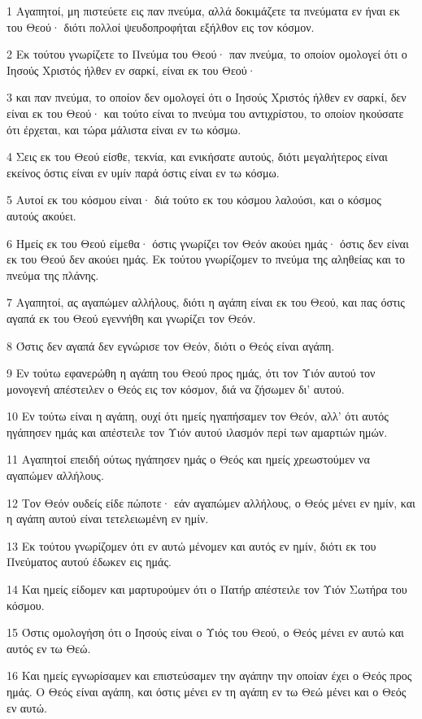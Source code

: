 \par 1 Αγαπητοί, μη πιστεύετε εις παν πνεύμα, αλλά δοκιμάζετε τα πνεύματα εν ήναι εκ του Θεού· διότι πολλοί ψευδοπροφήται εξήλθον εις τον κόσμον.
\par 2 Εκ τούτου γνωρίζετε το Πνεύμα του Θεού· παν πνεύμα, το οποίον ομολογεί ότι ο Ιησούς Χριστός ήλθεν εν σαρκί, είναι εκ του Θεού·
\par 3 και παν πνεύμα, το οποίον δεν ομολογεί ότι ο Ιησούς Χριστός ήλθεν εν σαρκί, δεν είναι εκ του Θεού· και τούτο είναι το πνεύμα του αντιχρίστου, το οποίον ηκούσατε ότι έρχεται, και τώρα μάλιστα είναι εν τω κόσμω.
\par 4 Σεις εκ του Θεού είσθε, τεκνία, και ενικήσατε αυτούς, διότι μεγαλήτερος είναι εκείνος όστις είναι εν υμίν παρά όστις είναι εν τω κόσμω.
\par 5 Αυτοί εκ του κόσμου είναι· διά τούτο εκ του κόσμου λαλούσι, και ο κόσμος αυτούς ακούει.
\par 6 Ημείς εκ του Θεού είμεθα· όστις γνωρίζει τον Θεόν ακούει ημάς· όστις δεν είναι εκ του Θεού δεν ακούει ημάς. Εκ τούτου γνωρίζομεν το πνεύμα της αληθείας και το πνεύμα της πλάνης.
\par 7 Αγαπητοί, ας αγαπώμεν αλλήλους, διότι η αγάπη είναι εκ του Θεού, και πας όστις αγαπά εκ του Θεού εγεννήθη και γνωρίζει τον Θεόν.
\par 8 Όστις δεν αγαπά δεν εγνώρισε τον Θεόν, διότι ο Θεός είναι αγάπη.
\par 9 Εν τούτω εφανερώθη η αγάπη του Θεού προς ημάς, ότι τον Υιόν αυτού τον μονογενή απέστειλεν ο Θεός εις τον κόσμον, διά να ζήσωμεν δι' αυτού.
\par 10 Εν τούτω είναι η αγάπη, ουχί ότι ημείς ηγαπήσαμεν τον Θεόν, αλλ' ότι αυτός ηγάπησεν ημάς και απέστειλε τον Υιόν αυτού ιλασμόν περί των αμαρτιών ημών.
\par 11 Αγαπητοί επειδή ούτως ηγάπησεν ημάς ο Θεός και ημείς χρεωστούμεν να αγαπώμεν αλλήλους.
\par 12 Τον Θεόν ουδείς είδε πώποτε· εάν αγαπώμεν αλλήλους, ο Θεός μένει εν ημίν, και η αγάπη αυτού είναι τετελειωμένη εν ημίν.
\par 13 Εκ τούτου γνωρίζομεν ότι εν αυτώ μένομεν και αυτός εν ημίν, διότι εκ του Πνεύματος αυτού έδωκεν εις ημάς.
\par 14 Και ημείς είδομεν και μαρτυρούμεν ότι ο Πατήρ απέστειλε τον Υιόν Σωτήρα του κόσμου.
\par 15 Όστις ομολογήση ότι ο Ιησούς είναι ο Υιός του Θεού, ο Θεός μένει εν αυτώ και αυτός εν τω Θεώ.
\par 16 Και ημείς εγνωρίσαμεν και επιστεύσαμεν την αγάπην την οποίαν έχει ο Θεός προς ημάς. Ο Θεός είναι αγάπη, και όστις μένει εν τη αγάπη εν τω Θεώ μένει και ο Θεός εν αυτώ.
